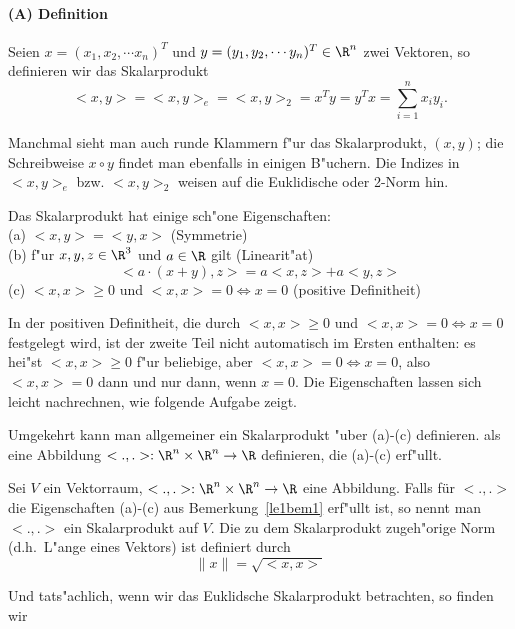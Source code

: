 \paragraph{(A) Definition }
\begin{sdefi}
Seien $x=(x_1, x_2, \cdots x_n)^T$ und $y = (y_1, y_2, \cdots y_n)^T\in \R^n$ 
zwei Vektoren, so definieren wir
das Skalarprodukt
$$ <x,y> = <x,y>_e = <x,y>_2 = x^T y = y^T x = \sum_{i=1}^n x_iy_i.$$
\end{sdefi}
Manchmal sieht man auch runde Klammern f"ur das Skalarprodukt, $(x,y)$; 
die Schreibweise $x\circ y$ findet man ebenfalls in einigen B"uchern. 
Die Indizes in $<x,y>_e$ bzw. $<x,y>_2$ weisen auf die Euklidische oder
2-Norm hin. 
\begin{sbem}\label{le1bem1}
Das Skalarprodukt hat einige sch"one Eigenschaften:\\
(a) $<x,y> = <y,x>$ (Symmetrie) \\
(b) f"ur $x,y,z\in\R^3$ und $a\in\R$ gilt (Linearit"at)
$$<a\cdot(x+y),z> = a<x,z> +a <y,z>$$
(c) $<x,x>\geq 0$ und $<x,x>= 0\Leftrightarrow x = 0$ (positive Definitheit)
\end{sbem}
In der positiven Definitheit, die durch $<x,x>\geq 0$ und $<x,x>= 0\Leftrightarrow x = 0$
festgelegt wird, ist der zweite Teil nicht automatisch im Ersten enthalten: 
es hei"st $<x,x>\geq 0$ f"ur beliebige, aber $<x,x>= 0\Leftrightarrow x = 0$,
also $<x, x> = 0$ dann und nur dann, wenn $x = 0$. Die Eigenschaften lassen sich 
leicht nachrechnen, wie folgende Aufgabe zeigt.
\begin{auf}\chb\label{block1A1}

\end{auf}
Umgekehrt kann man allgemeiner ein Skalarprodukt "uber (a)-(c) definieren.
als eine
Abbildung $<.,.>:\R^n\times \R^n\rightarrow \R$ definieren, die (a)-(c) erf"ullt. 
\begin{sdefi} Sei $V$ ein Vektorraum, $<.,.>:\R^n\times \R^n\rightarrow \R$
eine Abbildung. Falls f\"ur $<.,.>$ die Eigenschaften (a)-(c) aus 
Bemerkung~\ref{le1bem1} erf"ullt ist, so nennt man $<.,.>$ ein Skalarprodukt 
auf $V$. 
Die zu dem Skalarprodukt zugeh"orige Norm (d.h.\ L"ange eines Vektors) 
ist definiert durch
$$\|x\| =  \sqrt{<x,x>}$$
\end{sdefi}
Und tats"achlich, wenn wir das Euklidsche Skalarprodukt betrachten, so finden wir
